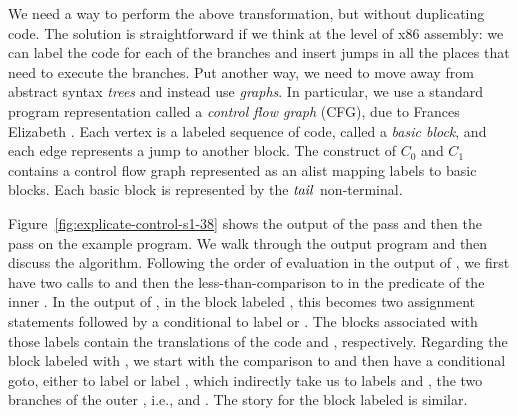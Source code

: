 \documentclass[11pt]{book}
\begin{document}
We need a way to perform the above transformation, but without
duplicating code. The solution is straightforward if we think at the
level of x86 assembly: we can label the code for each of the branches
and insert jumps in all the places that need to execute the
branches. Put another way, we need to move away from abstract syntax
\emph{trees} and instead use \emph{graphs}. In particular, we 
use a standard program representation called a \emph{control flow
  graph} (CFG), due to Frances Elizabeth \citet{Allen:1970uq}.
Each vertex is a labeled sequence of code, called a \emph{basic block}, and
each edge represents a jump to another block. The 
construct of $C_0$ and $C_1$ contains a control flow graph represented
as an alist mapping labels to basic blocks. Each basic block is
represented by the $\mathit{tail}$ non-terminal.

Figure~\ref{fig:explicate-control-s1-38} shows the output of the
 pass and then the
 pass on the example program. We walk through
the output program and then discuss the algorithm.
%
Following the order of evaluation in the output of
, we first have two calls to 
and then the less-than-comparison to  in the predicate of the
inner .  In the output of , in the
block labeled , this becomes two assignment statements
followed by a conditional  to label  or
. The blocks associated with those labels contain the
translations of the code  and ,
respectively. Regarding the block labeled with , we
start with the comparison to  and then have a conditional
goto, either to label  or label , which
indirectly take us to labels  and , the
two branches of the outer , i.e.,  and . The story for the block labeled  is similar.
\end{document}

